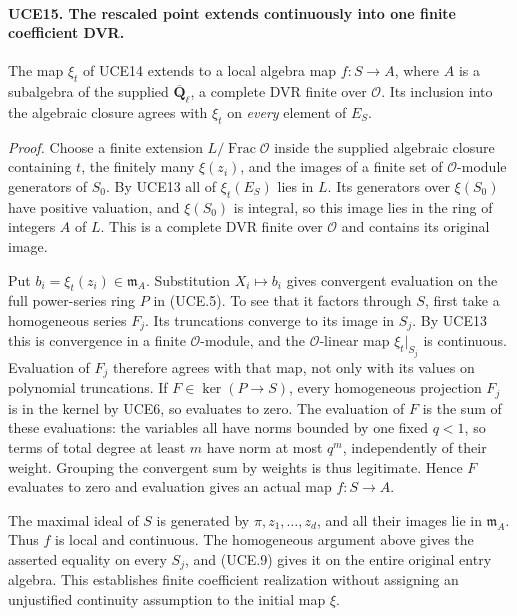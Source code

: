\documentclass[11pt,a4paper]{article}
\numberwithin{equation}{section}
\theoremstyle{remark}\newtheorem{remark}[theorem]{Remark}
\begin{document}
\paragraph{UCE15. The rescaled point extends continuously into one finite coefficient DVR.}
\label{claim:UCE15}
The map \(\xi_t\) of UCE14 extends to a local algebra map
\(f:S\to A\), where \(A\) is a subalgebra of the supplied
\(\overline{\mathbf Q}_\ell\), a complete DVR finite over
\(\mathcal O\).  Its inclusion into the algebraic closure agrees
with \(\xi_t\) on \emph{every} element of \(E_S\).

\emph{Proof.}
Choose a finite extension \(L/\operatorname{Frac}\mathcal O\)
inside the supplied algebraic closure containing \(t\), the
finitely many \(\xi(z_i)\), and the images of a finite set of
\(\mathcal O\)-module generators of \(S_0\).  By UCE13 all
of \(\xi_t(E_S)\) lies in \(L\).  Its generators over
\(\xi(S_0)\) have positive valuation, and \(\xi(S_0)\)
is integral, so this image lies in the ring of integers \(A\)
of \(L\).  This is a complete DVR finite over \(\mathcal O\)
and contains its original image.

Put \(b_i=\xi_t(z_i)\in\mathfrak m_A\).  Substitution
\(X_i\mapsto b_i\) gives convergent evaluation on the full
power-series ring \(P\) in (UCE.5).  To see that it factors
through \(S\), first take a homogeneous series \(F_j\).
Its truncations converge to its image in \(S_j\).  By UCE13
this is convergence in a finite \(\mathcal O\)-module, and
the \(\mathcal O\)-linear map \(\xi_t|_{S_j}\) is continuous.
Evaluation of \(F_j\) therefore agrees with that map, not only
with its values on polynomial truncations.
If \(F\in\ker(P\to S)\), every homogeneous projection
\(F_j\) is in the kernel by UCE6, so evaluates to zero.
The evaluation of \(F\) is the sum of these evaluations:
the variables all have norms bounded by one fixed \(q<1\),
so terms of total degree at least \(m\) have norm at most
\(q^m\), independently of their weight.  Grouping the convergent
sum by weights is thus legitimate.  Hence \(F\) evaluates to
zero and evaluation gives an actual map \(f:S\to A\).

The maximal ideal of \(S\) is generated by \(\pi,z_1,\ldots,z_d\),
and all their images lie in \(\mathfrak m_A\).  Thus \(f\)
is local and continuous.  The homogeneous argument above gives
the asserted equality on every \(S_j\), and (UCE.9) gives it
on the entire original entry algebra.  This establishes finite
coefficient realization without assigning an unjustified
continuity assumption to the initial map \(\xi\).
\end{document}
